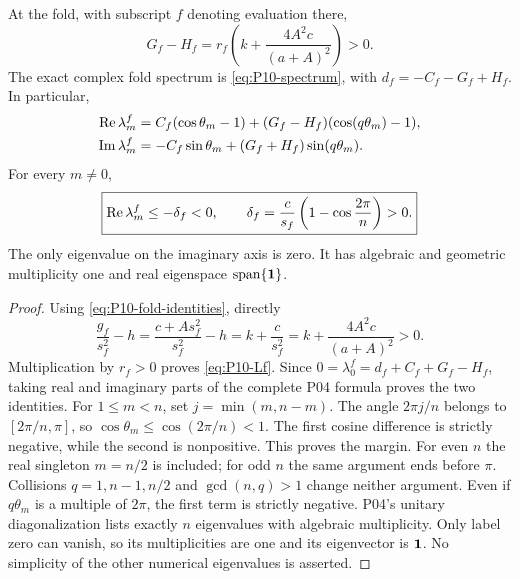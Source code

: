 \begin{lemma}
\label{lem:P10-gap}
At the fold, with subscript $f$ denoting evaluation there,
\begin{equation}
 \boxed{G_f-H_f=r_f\left(k+\frac{4A^2c}{(a+A)^2}\right)>0.}
 \label{eq:P10-Lf}
\end{equation}
The exact complex fold spectrum is \eqref{eq:P10-spectrum}, with
$d_f=-C_f-G_f+H_f$. In particular,
\begin{align}
 \operatorname{Re}\lambda_m^f
 &=C_f(\cos\theta_m-1)+(G_f-H_f)(\cos(q\theta_m)-1),
 \label{eq:P10-fold-real}\\
 \operatorname{Im}\lambda_m^f&=-C_f\sin\theta_m+(G_f+H_f)\sin(q\theta_m).
 \label{eq:P10-fold-imag}
\end{align}
For every $m\ne0$,
\begin{equation}
 \boxed{\operatorname{Re}\lambda_m^f\le-\delta_f<0,\qquad
 \delta_f=\frac c{s_f}\left(1-\cos\frac{2\pi}{n}\right)>0.}
 \label{eq:P10-gap}
\end{equation}
The only eigenvalue on the imaginary axis is zero. It has algebraic
and geometric multiplicity one and real eigenspace
$\operatorname{span}\{\mathbf{1}\}$.
\end{lemma}
\begin{proof}
Using \eqref{eq:P10-fold-identities}, directly
\begin{equation}
 \frac{g_f}{s_f^2}-h
 =\frac{c+A s_f^2}{s_f^2}-h
 =k+\frac c{s_f^2}=k+\frac{4A^2c}{(a+A)^2}>0.
 \label{eq:P10-effective}
\end{equation}
Multiplication by $r_f>0$ proves \eqref{eq:P10-Lf}.
Since $0=\lambda_0^f=d_f+C_f+G_f-H_f$, taking real and imaginary
parts of the complete P04 formula proves the two identities.
For $1\le m<n$, set $j=\min(m,n-m)$. The angle
$2\pi j/n$ belongs to $[2\pi/n,\pi]$, so
$\cos\theta_m\le\cos(2\pi/n)<1$. The first cosine difference
is strictly negative, while the second is nonpositive. This proves
the margin. For even $n$ the real singleton $m=n/2$ is included;
for odd $n$ the same argument ends before $\pi$. Collisions
$q=1,n-1,n/2$ and $\gcd(n,q)>1$ change neither argument.
Even if $q\theta_m$ is a multiple of $2\pi$, the first term is
strictly negative. P04's unitary diagonalization lists exactly $n$
eigenvalues with algebraic multiplicity. Only label zero can vanish,
so its multiplicities are one and its eigenvector is $\mathbf{1}$.
No simplicity of the other numerical eigenvalues is asserted.
\end{proof}

